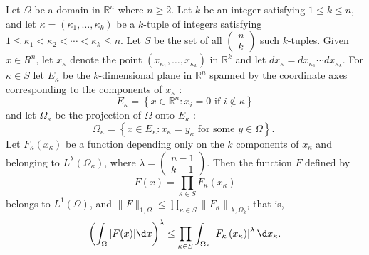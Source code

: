 \begin{lemma}
  Let $\Omega$ be a domain in $\mathbb{R}^n$ where $n \geq 2$. Let $k$ be an integer satisfying $1 \leq k \leq n$, and let $\kappa=\left(\kappa_1, \ldots, \kappa_k\right)$ be a $k$-tuple of integers satisfying $1 \leq \kappa_1<\kappa_2<\cdots<\kappa_k \leq n$. Let $S$ be the set of all $\left(\begin{array}{l}n \\ k\end{array}\right)$ such $k$-tuples. Given $x \in R^n$, let $x_\kappa$ denote the point $\left(x_{\kappa_1}, \ldots, x_{\kappa_k}\right)$ in $\mathbb{R}^k$ and let $d x_\kappa=d x_{\kappa_1} \cdots d x_{\kappa_k}$.
  For $\kappa \in S$ let $E_\kappa$ be the $k$-dimensional plane in $\mathbb{R}^n$ spanned by the coordinate axes corresponding to the components of $x_\kappa$ :
  \[
  E_\kappa=\left\{x \in \mathbb{R}^n: x_i=0 \text { if } i \notin \kappa\right\}
  \]
  and let $\Omega_\kappa$ be the projection of $\Omega$ onto $E_\kappa$ :
  \[
  \Omega_\kappa=\left\{x \in E_\kappa: x_\kappa=y_\kappa \text { for some } y \in \Omega\right\} \text {. }
  \]
  Let $F_\kappa\left(x_\kappa\right)$ be a function depending only on the $k$ components of $x_\kappa$ and belonging to $L^\lambda\left(\Omega_\kappa\right)$, where $\lambda=\left(\begin{array}{l}n-1 \\ k-1\end{array}\right)$. Then the function $F$ defined by
  \[
  F(x)=\prod_{\kappa \in S} F_\kappa\left(x_\kappa\right)
  \]
  belongs to $L^1(\Omega)$, and $\|F\|_{1, \Omega} \leq \prod_{\kappa \in S}\left\|F_\kappa\right\|_{\lambda, \Omega_k}$, that is,
  \[
  \left(\int_{\Omega}|F(x)| \d x\right)^\lambda \leq \prod_{\kappa \in S} \int_{\Omega_\kappa}\left|F_\kappa\left(x_\kappa\right)\right|^\lambda \d x_\kappa .
  \]
\end{lemma}


